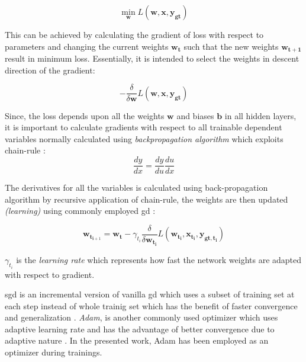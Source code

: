 \begin{equation}
\min _{\mathbf{w}} L\left(\mathbf{w}, \mathbf{x}, \mathbf{{y}_{\mathbf{gt}}}\right)
\end{equation}

This can be achieved by calculating the gradient of loss with respect to parameters and changing the current weights $\mathbf{w_{t}}$ such that the new weights $\mathbf{w_{t + 1}}$ result in minimum loss. Essentially, it is intended to select the weights in descent direction of the gradient:

\begin{equation}
- \frac{\delta}{\delta \mathbf{w}} L\left(\mathbf{w}, \mathbf{x}, \mathbf{y}_{\mathbf{gt}}\right)
\end{equation}

Since, the loss depends upon all the weights $\mathbf{w}$ and biases $\mathbf{b}$ in all hidden layers, it is important to calculate gradients with respect to all trainable dependent variables normally calculated using \textit{backpropagation algorithm} \cite{Svozil1997} which exploits chain-rule :
\begin{equation}\frac{d y}{d x}=\frac{d y}{d u} \frac{d u}{d x}\end{equation}

The derivatives for all the variables is calculated using back-propagation  algorithm by recursive application of chain-rule, the weights are then updated \textit{(learning)} using commonly employed \gls{gd} \cite{Goodfellow-et-al-2016}:

\begin{equation}\mathbf{w}_{\mathbf{t}_{\mathbf{i}+1}}=\mathbf{w}_{\mathbf{t}}-\gamma_{t_{i}} \frac{\delta}{\delta \mathbf{w}_{\mathbf{t}_{\mathbf{i}}}} L\left(\mathbf{w}_{\mathbf{t}_{\mathbf{i}}}, \mathbf{x}_{\mathbf{t}_{\mathbf{i}}}, \mathbf{y}_{\mathbf{g} \mathbf{t}, \mathbf{t}_{\mathbf{i}}}\right)\end{equation}


$\gamma_{t_{i}}$ is the \textit{learning rate} which represents how fast the network weights are adapted with respect to gradient.

\gls{sgd} is an incremental version of vanilla \gls{gd} which uses a subset of training set at each step instead of whole trainig set which has the benefit of faster convergence and generalization \cite{Rumelhart1986}. \textit{Adam}, is another commonly used optimizer which uses adaptive learning rate and has the advantage of better convergence due to adaptive nature \cite{Goodfellow-et-al-2016}. In the presented work, Adam has been employed as an optimizer during trainings.

